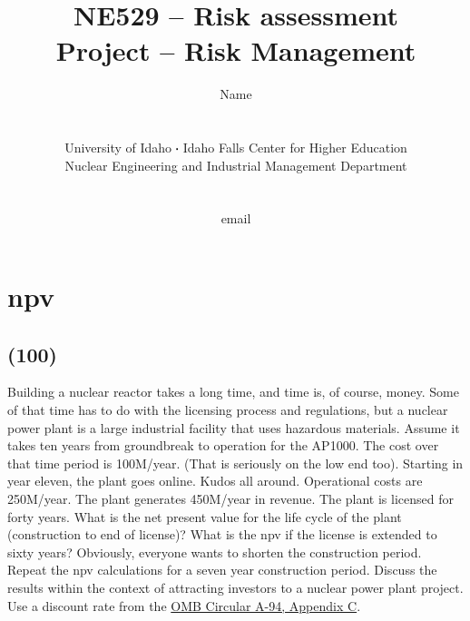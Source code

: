 \documentclass[11pt,a4paper]{article}
\newcommand*\sq{\mathbin{\vcenter{\hbox{\rule{.3ex}{.3ex}}}}} %
\newcommand{\acl}{\acrlong} %
\newcommand{\acs}{\acrshort} %
\begin{document}
\begin{titlepage}
    \title{
        NE529 -- Risk assessment\\
        Project  -- Risk Management\\
    }
    \author{
        Name
        \\ \\ \\
        University of Idaho $\sq$ Idaho Falls Center for Higher Education\\
        Nuclear Engineering and Industrial Management Department
        \\ \\ \\
        email 
    }
\clearpage %
\maketitle
\vspace*{\fill}
\thispagestyle{empty} %
\end{titlepage}


\section{\acl{npv}}
\subsection*{(100)}
Building a nuclear reactor takes a long time, and time is, of course, money. Some of that time has to do with the licensing process and regulations, but a nuclear power plant is a large industrial facility that uses hazardous materials. Assume it takes ten years from groundbreak to operation for the AP1000. The cost over that time period is 100M/year. (That is seriously on the low end too). Starting in year eleven, the plant goes online. Kudos all around. Operational costs are 250M/year. The plant generates 450M/year in revenue. The plant is licensed for forty years. What is the net present value for the life cycle of the plant (construction to end of license)? What is the \acs{npv} if the license is extended to sixty years? Obviously, everyone wants to shorten the construction period. Repeat the \acs{npv} calculations for a seven year construction period. Discuss the results within the context of attracting investors to a nuclear power plant project. Use a discount rate from the \href{https://www.federalregister.gov/documents/2023/12/29/2023-28727/discount-rates-for-cost-effectiveness-analysis-of-federal-programs}{OMB Circular A-94, Appendix C}.
\end{document}
